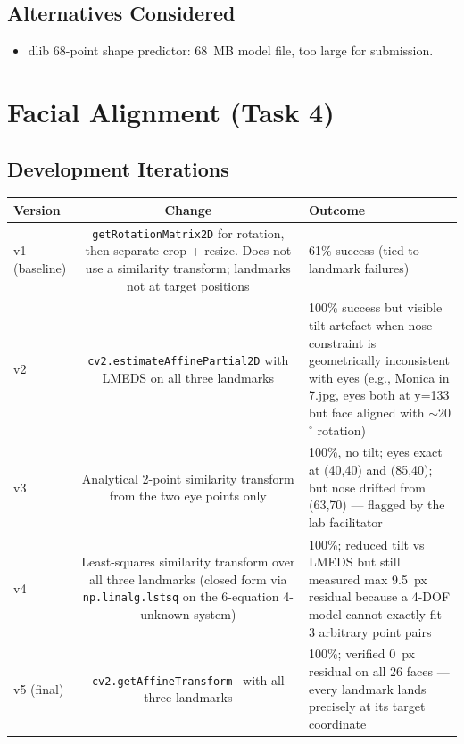 \documentclass[11pt,a4paper,titlepage]{article}
\begin{document}
\subsection{Alternatives Considered}
\begin{itemize}
  \item dlib 68-point shape predictor: 68~MB model file, too large for submission.
\end{itemize}

\section{Facial Alignment (Task 4)}

\subsection{Development Iterations}
\noindent
\begin{tabularx}{\linewidth}{@{}V C O@{}}
\toprule
\textbf{Version} & \textbf{Change} & \textbf{Outcome} \\
\midrule
v1 (baseline) & \texttt{getRotationMatrix2D} for rotation, then separate crop
                + resize. Does not use a similarity transform; landmarks not
                at target positions
              & 61\% success (tied to landmark failures) \\
v2 & \texttt{cv2.estimateAffinePartial2D} with LMEDS on all three landmarks
   & 100\% success but visible tilt artefact when nose constraint is geometrically
     inconsistent with eyes (e.g., Monica in 7.jpg, eyes both at y=133 but face
     aligned with $\sim$20$^{\circ}$ rotation) \\
v3 & Analytical 2-point similarity transform from the two eye points only
   & 100\%, no tilt; eyes exact at (40,40) and (85,40); but nose drifted from
     (63,70) --- flagged by the lab facilitator \\
v4 & Least-squares similarity transform over all three landmarks (closed form
     via \texttt{np.linalg.lstsq} on the 6-equation 4-unknown system)
   & 100\%; reduced tilt vs LMEDS but still measured max 9.5~px residual
     because a 4-DOF model cannot exactly fit 3 arbitrary point pairs \\
v5 (final) & \texttt{cv2.getAffineTransform}~\citep{bradski2000opencv} with all
             three landmarks
           & 100\%; verified 0~px residual on all 26 faces --- every landmark
             lands precisely at its target coordinate \\
\bottomrule
\end{tabularx}
\end{document}

